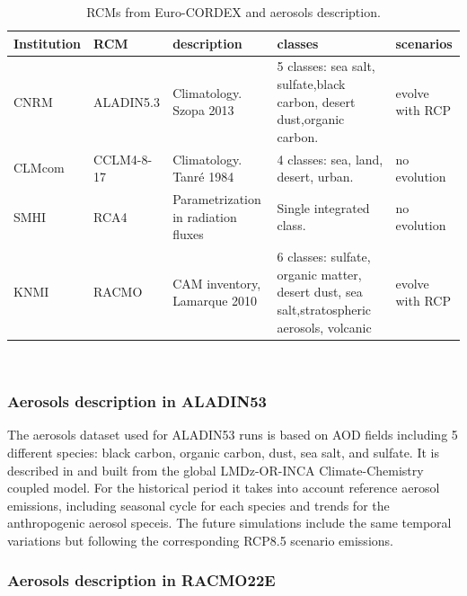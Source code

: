 
\begin{table}[h!]
\caption[RCMs from Euro-CORDEX and aerosols description]{\label{tb:aero}RCMs from Euro-CORDEX and aerosols description.}
\footnotesize
\begin{tabular}{>{\raggedrigth}m{1.3cm}>{\raggedright}m{1.5cm}|>{\raggedright}m{2.2cm}>{\raggedright}m{2.2cm}>{\raggedright}m{2cm}}
\toprule 
Institution  & RCM & description & classes & scenarios \tabularnewline
\midrule
CNRM & ALADIN5.3 & Climatology. Szopa 2013 & 5 classes: sea salt, sulfate,black carbon, desert dust,organic carbon.& evolve with RCP \tabularnewline
CLMcom&CCLM4-8-17& Climatology. Tanré 1984 & 4 classes: sea, land, desert, urban.& no evolution\tabularnewline 
SMHI&RCA4& Parametrization in radiation fluxes & Single integrated class.& no evolution \tabularnewline
KNMI&RACMO&CAM inventory, Lamarque 2010 & 6 classes: sulfate, organic matter, desert dust, sea salt,stratospheric aerosols, volcanic & evolve with RCP\tabularnewline
\bottomrule
\end{tabular}\\
\end{table}
\normalsize

\subsubsection{Aerosols description in ALADIN53}

The aerosols dataset used for ALADIN53 runs is based on AOD fields including 5 different species: black carbon, organic carbon, dust, sea salt, and sulfate. It is described in \cite*{Szopa2013} and built from the global LMDz-OR-INCA Climate-Chemistry coupled model. For the historical period it takes into account reference aerosol emissions, including seasonal cycle for each species and trends for the anthropogenic aerosol speceis. The future simulations include the same temporal variations but following the corresponding RCP8.5 scenario emissions. 

\subsubsection{Aerosols description in RACMO22E}

